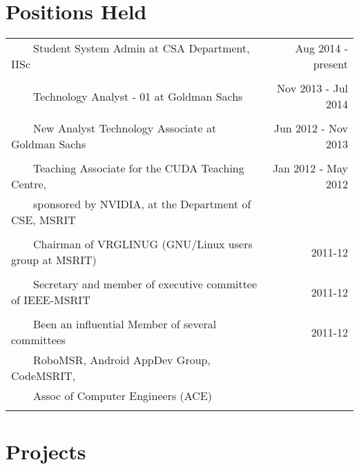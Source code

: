 \documentclass[a4paper,10pt]{article} %
\newcommand{\tabitem}{~~\llap{\textbullet}~~}
\begin{document}
\section{Positions Held}

\begin{tabular}{lr}
\tabitem Student System Admin at CSA Department, IISc & Aug 2014 - present \\
&\\
\tabitem Technology Analyst - 01 at Goldman Sachs & Nov 2013 - Jul 2014\\
&\\
\tabitem New Analyst Technology Associate at Goldman Sachs & Jun 2012 - Nov 2013\\
&\\
\tabitem Teaching Associate for the CUDA Teaching Centre,  & Jan 2012 - May 2012\\
~~~~sponsored by NVIDIA, at the Department of CSE, MSRIT &  \\
&\\
\tabitem Chairman of VRGLINUG (GNU/Linux users group at MSRIT) & 2011-12 \\
&\\
\tabitem Secretary and member of executive committee of IEEE-MSRIT & 2011-12 \\
&\\
\tabitem Been an influential Member of several committees & 2011-12 \\
~~~~RoboMSR, Android AppDev Group, CodeMSRIT, & \\
~~~~Assoc of Computer Engineers (ACE) & \\
&\\
\end{tabular}


\section{Projects}
\end{document}
